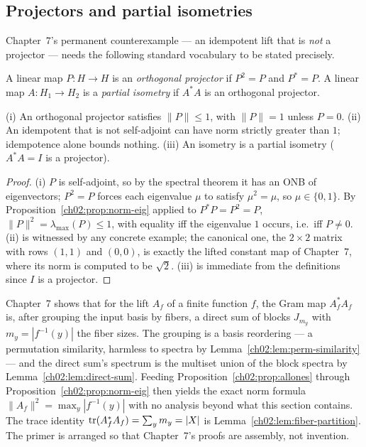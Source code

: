 \subsection{Projectors and partial isometries}

Chapter~7's permanent counterexample --- an idempotent lift that is
\emph{not} a projector --- needs the following standard vocabulary to be
stated precisely.

\begin{definition}\label{ch02:def:projector}
A linear map $P : H \to H$ is an \emph{orthogonal projector} if
$P^{2} = P$ and $P^{*} = P$. A linear map $A : H_1 \to H_2$ is a
\emph{partial isometry} if $A^{*} A$ is an orthogonal projector.
\end{definition}

\begin{proposition}\label{ch02:prop:projector-facts}
(i) An orthogonal projector satisfies $\lVert P \rVert \leq 1$, with
$\lVert P \rVert = 1$ unless $P = 0$. (ii) An idempotent that is not
self-adjoint can have norm strictly greater than $1$; idempotence alone
bounds nothing. (iii) An isometry is a partial isometry
($A^{*} A = I$ is a projector).
\end{proposition}

\begin{proof}
(i) $P$ is self-adjoint, so by the spectral theorem it has an ONB of
eigenvectors; $P^2 = P$ forces each eigenvalue $\mu$ to satisfy
$\mu^{2} = \mu$, so $\mu \in \{0, 1\}$. By
Proposition~\ref{ch02:prop:norm-eig} applied to
$P^{*} P = P^{2} = P$, $\lVert P \rVert^{2} = \lambda_{\max}(P)
\leq 1$, with equality iff the eigenvalue $1$ occurs, i.e.\ iff
$P \neq 0$. (ii) is witnessed by any concrete example; the canonical
one, the $2 \times 2$ matrix with rows $(1, 1)$ and $(0, 0)$, is
exactly the lifted constant map of Chapter~7, where its norm is computed
to be $\sqrt{2}$. (iii) is immediate from the definitions since $I$ is
a projector.
\end{proof}

\begin{remark}\label{ch02:rem:why-these}
Chapter~7 shows that for the lift $A_f$ of a finite function $f$, the Gram
map $A_f^{*} A_f$ is, after grouping the input basis by fibers, a direct
sum of blocks $J_{m_y}$ with $m_y = |f^{-1}(y)|$ the fiber sizes. The
grouping is a basis reordering --- a permutation similarity, harmless to
spectra by Lemma~\ref{ch02:lem:perm-similarity} --- and the direct sum's
spectrum is the multiset union of the block spectra by
Lemma~\ref{ch02:lem:direct-sum}. Feeding
Proposition~\ref{ch02:prop:allones} through
Proposition~\ref{ch02:prop:norm-eig} then yields the exact norm formula
$\lVert A_f \rVert^{2} = \max_y |f^{-1}(y)|$ with no analysis beyond what
this section contains. The trace identity
$\mathrm{tr}(A_f^{*} A_f) = \sum_y m_y = |X|$ is
Lemma~\ref{ch02:lem:fiber-partition}. The primer is arranged so that
Chapter~7's proofs are assembly, not invention.
\end{remark}

